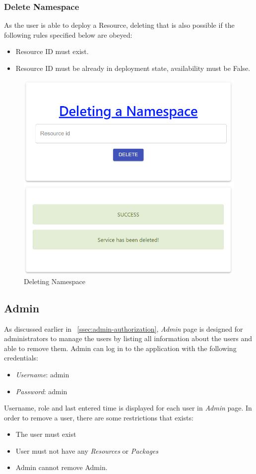 \subsubsection{Delete Namespace}
As the user is able to deploy a Resource, deleting that is also possible if the following rules specified below are obeyed:
\begin{itemize}
  \item Resource ID must exist.
  \item Resource ID must be already in deployment state, availability must be False.
\end{itemize}

\begin{figure}[H]
	\centering
	\includegraphics[width=130mm]{images/delete-namespace-2.png}
	\caption{Deleting Namespace}
	\label{ssec:deleting-a-namespace}
\end{figure}

\subsection{Admin}
As discussed earlier in ~\autoref{ssec:admin-authorization}, \emph{Admin} page is designed for administrators to manage the users by listing all information about the users and able to remove them.
Admin can log in to the application with the following credentials:
\begin{itemize}
  \item \emph{Username}: admin
  \item \emph{Password}: admin
\end{itemize}
Username, role and last entered time is displayed for each user in \emph{Admin} page. In order to remove a user, there are some restrictions that exists:
\begin{itemize}
  \item The user must exist
  \item User must not have any \emph{Resources} or \emph{Packages}
  \item Admin cannot remove Admin.
\end{itemize}

